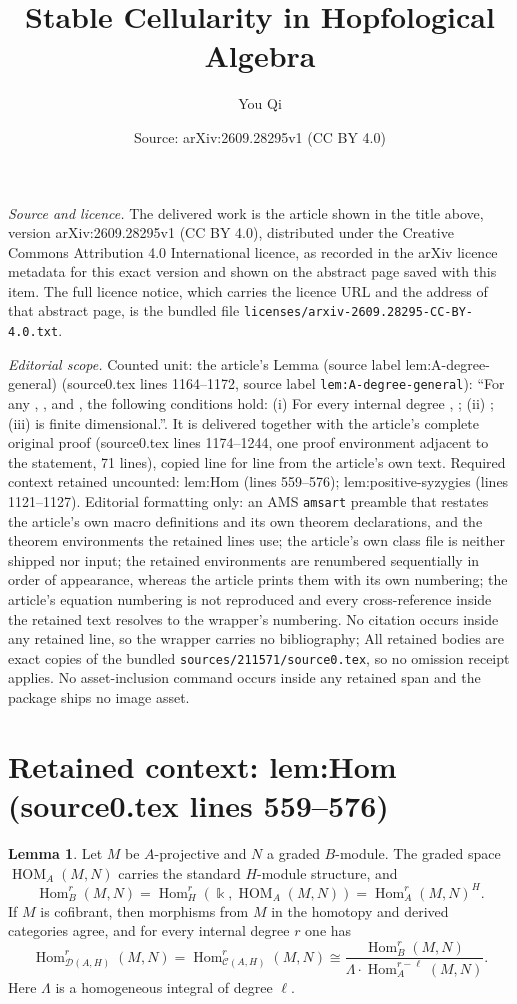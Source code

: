 \documentclass[10pt,a4paper]{amsart}
\title[Stable Cellularity in Hopfological Algebra]{Stable Cellularity in Hopfological Algebra}
\author{You Qi}
\date{Source: arXiv:2609.28295v1 (CC BY 4.0)}
\newcommand{\Cat}{\mathcal{C}}
\newcommand{\Der}{\mathcal{D}}
\newcommand{\HOM}{\operatorname{HOM}}
\newcommand{\Hom}{\operatorname{Hom}}
\newcommand{\kk}{\Bbbk}
\theoremstyle{definition}
\newtheorem{lem}[thm]{Lemma}
\begin{document}
\maketitle

\noindent\emph{Source and licence.} The delivered work is the article shown in the title above, version arXiv:2609.28295v1 (CC BY 4.0), distributed under the Creative Commons Attribution 4.0 International licence, as recorded in the arXiv licence metadata for this exact version and shown on the abstract page saved with this item. The full licence notice, which carries the licence URL and the address of that abstract page, is the bundled file \texttt{licenses/arxiv-2609.28295-CC-BY-4.0.txt}.
\par\smallskip

\noindent\textit{Editorial scope.} Counted unit: the article's Lemma (source label lem:A-degree-general) (source0.tex lines 1164--1172, source label \texttt{lem:A-degree-general}): ``For any , , and , the following conditions hold: (i) For every internal degree , ; (ii) ; (iii) is finite dimensional.''. It is delivered together with the article's complete original proof (source0.tex lines 1174--1244, one proof environment adjacent to the statement, 71 lines), copied line for line from the article's own text. Required context retained uncounted: lem:Hom (lines 559--576); lem:positive-syzygies (lines 1121--1127). Editorial formatting only: an AMS \texttt{amsart} preamble that restates the article's own macro definitions and its own theorem declarations, and the theorem environments the retained lines use; the article's own class file is neither shipped nor input; the retained environments are renumbered sequentially in order of appearance, whereas the article prints them with its own numbering; the article's equation numbering is not reproduced and every cross-reference inside the retained text resolves to the wrapper's numbering. No citation occurs inside any retained line, so the wrapper carries no bibliography; All retained bodies are exact copies of the bundled \texttt{sources/211571/source0.tex}, so no omission receipt applies. No asset-inclusion command occurs inside any retained span and the package ships no image asset.


\section*{Retained context: lem:Hom (source0.tex lines 559--576)}

\begin{lem}\label{lem:Hom}
Let $M$ be $A$-projective and $N$ a graded $B$-module.  The graded space
$\HOM_A(M,N)$ carries the standard $H$-module structure, and
\[
\Hom_B^r(M,N)=\Hom_H^r(\kk,\HOM_A(M,N))= \Hom_A^r(M, N)^H .
\]
If $M$ is cofibrant, then morphisms from $M$ in the homotopy and derived
categories agree, and for every internal degree $r$ one has
\begin{equation}\label{eq:HOM-formula}
\Hom_{\Der(A,H)}^{r}(M,N)
=
\Hom_{\Cat(A,H)}^{r}(M,N)
\cong
\dfrac{\Hom_B^r(M,N)}
{\Lambda\cdot \Hom_A^{r-\ell}(M,N)} .
\end{equation}
Here $\Lambda$ is a homogeneous integral of degree $\ell$.  
\end{lem}
\end{document}
